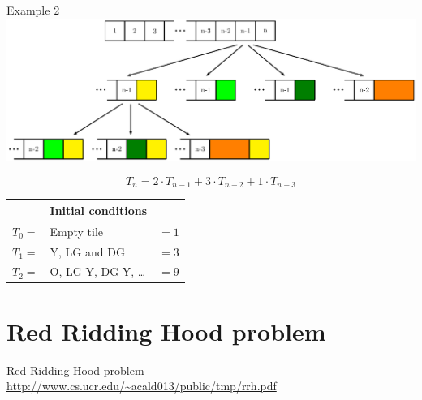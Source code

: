 \documentclass{beamer}
\begin{document}
\begin{frame}{Example 2}
    \centering
    \includegraphics[width=0.8\linewidth]{tiling2}

    $$ T_n = 2 \cdot T_{n-1} + 3 \cdot T_{n-2} + 1 \cdot T_{n-3}$$
    
    \begin{tabular}{l l l} \hline
                    & Initial conditions   &        \\ \hline
        $T_0 = $    & Empty tile           & $ = 1$ \\
        $T_1 = $    & Y, LG and DG         & $ = 3$ \\
        $T_2 = $    & O, LG-Y, DG-Y, \dots & $ = 9$ \\ \hline
    \end{tabular}
\end{frame}

\section{Red Ridding Hood problem}

\begin{frame}{Red Ridding Hood problem}
    \centering
    \url{http://www.cs.ucr.edu/~acald013/public/tmp/rrh.pdf}
\end{frame}
\end{document}
